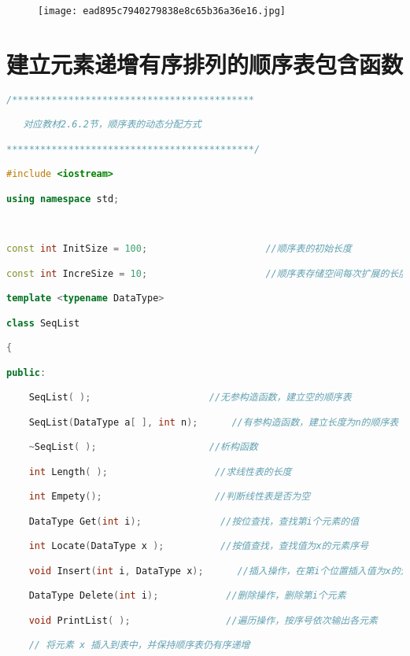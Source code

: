 \begin{figure}[H]
\centering
\texttt{[image: ead895c7940279838e8c65b36a36e16.jpg]}
\label{}
\end{figure}

\section{建立元素递增有序排列的顺序表包含函数}

\begin{lstlisting}[language=C++]
/*******************************************

   对应教材2.6.2节，顺序表的动态分配方式

********************************************/

#include <iostream>

using namespace std;

  

const int InitSize = 100;                     //顺序表的初始长度

const int IncreSize = 10;                     //顺序表存储空间每次扩展的长度

template <typename DataType>

class SeqList

{

public:

    SeqList( );                     //无参构造函数，建立空的顺序表

    SeqList(DataType a[ ], int n);      //有参构造函数，建立长度为n的顺序表

    ~SeqList( );                    //析构函数

    int Length( );                   //求线性表的长度

    int Empety();                    //判断线性表是否为空

    DataType Get(int i);              //按位查找，查找第i个元素的值

    int Locate(DataType x );          //按值查找，查找值为x的元素序号

    void Insert(int i, DataType x);      //插入操作，在第i个位置插入值为x的元素

    DataType Delete(int i);            //删除操作，删除第i个元素

    void PrintList( );                 //遍历操作，按序号依次输出各元素

    // 将元素 x 插入到表中，并保持顺序表仍有序递增


\end{lstlisting}
